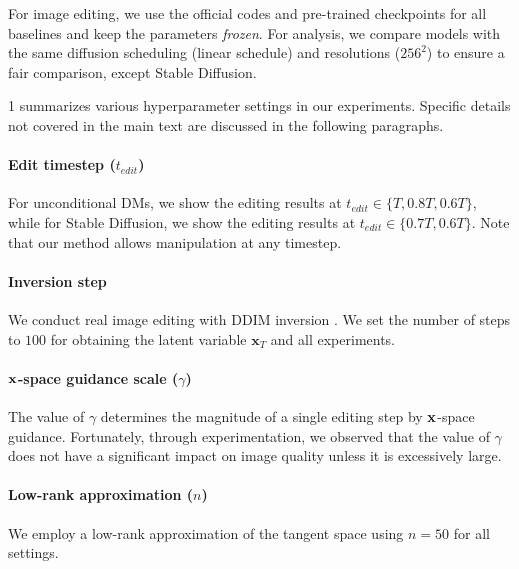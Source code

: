 For image editing, we use the official codes and pre-trained checkpoints for all baselines and keep the parameters \textit{frozen}. 
For analysis, we compare models with the same diffusion scheduling (linear schedule) and resolutions ($256^2$) to ensure a fair comparison, except Stable Diffusion.

1 summarizes various hyperparameter settings in our experiments. Specific details not covered in the main text are discussed in the following paragraphs.

\paragraph{Edit timestep ($t_{edit}$)}
For unconditional DMs, we show the editing results at $t_{edit} \in \{T, 0.8T, 0.6T\}$, while for Stable Diffusion, we show the editing results at $t_{edit} \in \{0.7T, 0.6T\}$. Note that our method allows manipulation at any timestep. 

\paragraph{Inversion step}
We conduct real image editing with DDIM inversion \cite{song2020denoising}. We set the number of steps to $100$ for obtaining the latent variable $\mathbf{x}_T$ and all experiments.

\paragraph{$\mathbf{x}$-space guidance scale ($\gamma$)}
The value of $\gamma$ determines the magnitude of a single editing step by $\mathbf{x}$-space guidance. Fortunately, through experimentation, we observed that the value of $\gamma$ does not have a significant impact on image quality unless it is excessively large.


\paragraph{Low-rank approximation ($n$)}
We employ a low-rank approximation of the tangent space using $n=50$ for all settings.

